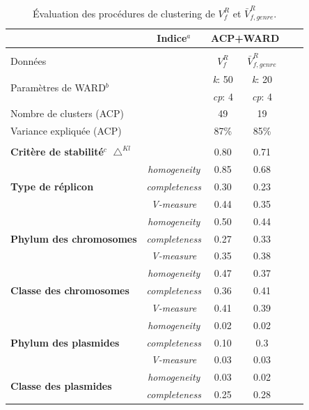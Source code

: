 \begin{table}[H]
	\begin{center}
	\caption[Évaluation des procédures de clustering fonctionnel des réplicons]{Évaluation des procédures de clustering de $V_{f}^{R}$ et $\bar{V}_{f,genre}^{R}$.}	\label{tabresclusterrecefunc}
	\begin{tabular}{l|c|cccc}
		 & \textbf{Indice$^{a}$}  & \multicolumn{2}{l}{\textbf{ACP+WARD}}   \\
		\hline
		 &  &  &  &   \\[-0.2cm]
		Données &  & $V_{f}^{R}$  & $\bar{V}_{f,genre}^{R}$   \\
		\multirow{2}{*}{Paramètres de WARD$^{b}$} &  & \textit{k}: 50  &  \textit{k}: 20  \\
		 &  & \textit{cp}: 4 & \textit{cp}: 4  \\
		Nombre de clusters (ACP) &  & 49 & 19  \\
		Variance expliquée (ACP) &  & 87\% & 85\%  \\
		\hline
		 &  &  &  &  \\ [-0.2cm]
		\textbf{Critère de stabilité}$^{c}$ $\bigtriangleup^{Kl}$ &  & 0.80 & 0.71  \\
		\hline
		\multirow{3}{*}{\textbf{Type de réplicon}} & \textit{homogeneity} & 0.85 & 0.68  \\
	 	& \textit{completeness} & 0.30 & 0.23 \\
		& \textit{V-measure} & 0.44 & 0.35 \\
		\hline
		\multirow{3}{*}{\textbf{Phylum des chromosomes}} & \textit{homogeneity} & 0.50 & 0.44  \\
		& \textit{completeness} & 0.27 & 0.33 \\
		& \textit{V-measure} & 0.35 & 0.38 \\
		\hline
		\multirow{3}{*}{\textbf{Classe des chromosomes}} & \textit{homogeneity} & 0.47 & 0.37  \\
		& \textit{completeness} & 0.36 & 0.41  \\
		& \textit{V-measure} & 0.41 & 0.39  \\
		\hline
		\multirow{3}{*}{\textbf{Phylum des plasmides}} & \textit{homogeneity} & 0.02 & 0.02  \\
		& \textit{completeness} & 0.10 & 0.3  \\
		& \textit{V-measure} & 0.03 & 0.03  \\
		\hline
		\multirow{3}{*}{\textbf{Classe des plasmides}} & \textit{homogeneity} & 0.03 & 0.02  \\
		& \textit{completeness} & 0.25 & 0.28  \\

\end{tabular}
\end{center}
\end{table}
